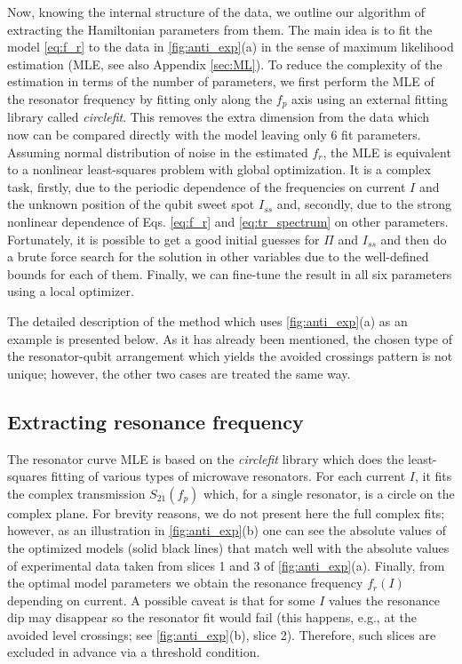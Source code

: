 \documentclass[%
 aip,
 amsmath,amssymb,
 reprint,%
]{revtex4-1}
\begin{document}
Now, knowing the internal structure of the data, we outline our algorithm of extracting the Hamiltonian parameters from them. The main idea is to fit the model \eqref{eq:f_r} to the data in \autoref{fig:anti_exp}(a) in the sense of maximum likelihood estimation\cite{bishop2006} (MLE, see also Appendix \ref{sec:ML}). To reduce the complexity of the estimation in terms of the number of parameters, we first perform the MLE of the resonator frequency by fitting only along the $f_p$ axis using an external fitting library called \textit{circlefit}\cite{probst2015}. This removes the extra dimension from the data which now can be compared directly with the model leaving only 6 fit parameters. Assuming normal distribution of noise in the estimated $f_r$, the MLE is equivalent to a nonlinear least-squares problem with global optimization. It is a complex task, firstly, due to the periodic dependence of the frequencies on current $I$ and the unknown position of the qubit sweet spot $I_{ss}$ and, secondly, due to the strong nonlinear dependence of Eqs. \eqref{eq:f_r} and \eqref{eq:tr_spectrum} on other parameters. Fortunately, it is possible to get a good initial guesses for $\Pi$ and $I_{ss}$ and then do a brute force search for the solution in other variables due to the well-defined bounds for each of them. Finally, we can fine-tune the result in all six parameters using a local optimizer.

The detailed description of the method which uses \autoref{fig:anti_exp}(a) as an example is presented below. As it has already been mentioned, the chosen type of the resonator-qubit arrangement which yields the avoided crossings pattern is not unique; however, the other two cases are treated the same way.

\subsection{Extracting resonance frequency}\label{sec:extract_fr}

The resonator curve MLE is based on the \textit{circlefit} library which does the least-squares fitting of various types of microwave resonators. For each current $I$, it fits the complex transmission $S_{21}(f_p)$ which, for a single resonator, is a circle on the complex plane\cite{probst2015}. For brevity reasons, we do not present here the full complex fits; however, as an illustration in \autoref{fig:anti_exp}(b) one can see the absolute values of the optimized models (solid black lines) that match well with the absolute values of experimental data taken from slices 1 and 3 of \autoref{fig:anti_exp}(a). Finally, from the optimal model parameters we obtain the resonance frequency $f_r(I)$ depending on current. A possible caveat is that for some $I$ values the resonance dip may disappear so the resonator fit would fail (this happens, e.g., at the avoided level crossings; see \autoref{fig:anti_exp}(b), slice 2). Therefore, such slices are excluded in advance via a threshold condition.
\end{document}

